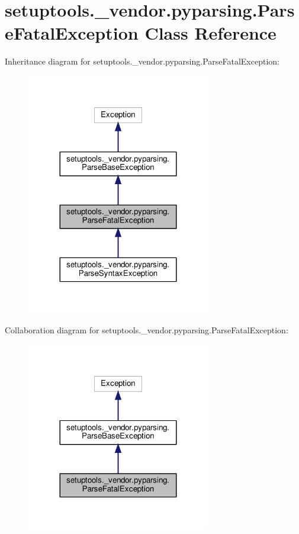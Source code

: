 \hypertarget{classsetuptools_1_1__vendor_1_1pyparsing_1_1ParseFatalException}{}\section{setuptools.\+\_\+vendor.\+pyparsing.\+Parse\+Fatal\+Exception Class Reference}
\label{classsetuptools_1_1__vendor_1_1pyparsing_1_1ParseFatalException}


Inheritance diagram for setuptools.\+\_\+vendor.\+pyparsing.\+Parse\+Fatal\+Exception\+:
\nopagebreak
\begin{figure}[H]
\begin{center}
\leavevmode
\includegraphics[width=227pt]{classsetuptools_1_1__vendor_1_1pyparsing_1_1ParseFatalException__inherit__graph}
\end{center}
\end{figure}


Collaboration diagram for setuptools.\+\_\+vendor.\+pyparsing.\+Parse\+Fatal\+Exception\+:
\nopagebreak
\begin{figure}[H]
\begin{center}
\leavevmode
\includegraphics[width=227pt]{classsetuptools_1_1__vendor_1_1pyparsing_1_1ParseFatalException__coll__graph}
\end{center}
\end{figure}

